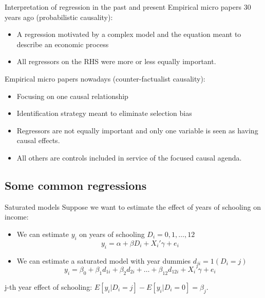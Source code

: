 \documentclass{beamer}
\begin{document}
\begin{frame}{Interpretation of regression in the past and present}
Empirical micro papers 30 years ago (probabilistic causality):
\begin{itemize}
\item A regression motivated by a complex model and the equation meant to describe an economic process
\item All regressors on the RHS were more or less equally important.
\end{itemize}\bigskip

Empirical micro papers nowadays (counter-factualist causality):
\begin{itemize}
\item Focusing on one causal relationship 
\item Identification strategy meant to eliminate selection bias
\item Regressors are not equally important and only one variable is seen as having causal effects.
\item All others are controls included in service of the focused causal agenda.

\end{itemize}

\end{frame}



\subsection{Some common regressions}

\begin{frame}{Saturated models}
Suppose we want to estimate the effect of years of schooling on income:
\begin{itemize}
\item We can estimate $y_i$ on years of schooling $D_i=0,1,\dots, 12$   \[y_i=\alpha+\beta D_i+X_i'\gamma +e_i \]\pause
\item We can estimate a saturated model with year dummies $d_{ji}=1(D_i=j)$
\[y_i=\beta_0+\beta_1 d_{1i}+\beta_2 d_{2i}+\dots+\beta_{12} d_{12i}+X_i'\gamma +e_i \]
\end{itemize}
j-th year effect of schooling: $E[y_i|D_i=j]-E[y_i|D_i=0]=\beta_j$.

\end{frame}
\end{document}
